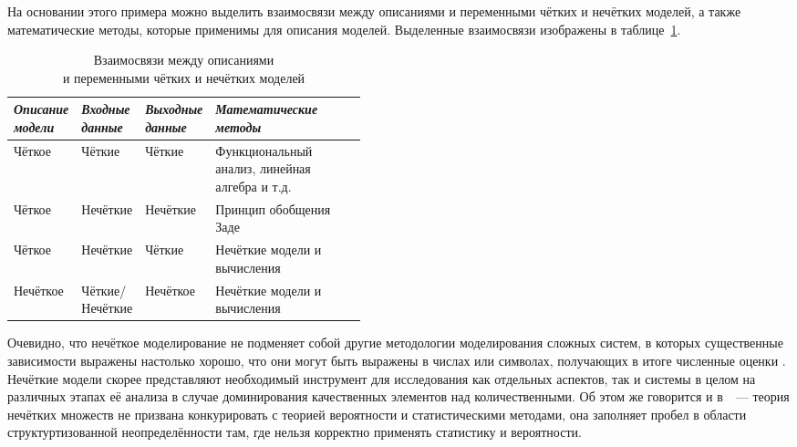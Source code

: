 На основании этого примера можно выделить взаимосвязи между описаниями и переменными чётких и нечётких моделей, а также математические методы, которые применимы для описания моделей. Выделенные взаимосвязи изображены в таблице~\ref{t:fuzzy-modeling-approaches}.
\begin{table}[h!]
\caption{Взаимосвязи между описаниями \\ и переменными чётких и нечётких моделей}
\label{t:fuzzy-modeling-approaches}
\begin{center}
\begin{tabularx}{\textwidth}{|p{0.15\linewidth}|p{0.15\linewidth}|p{0.15\linewidth}|X|}
	\hline
		\centering \textit{Описание модели} & \centering \textit{Входные данные} & \centering \textit{Выходные данные} & \centering \textit{Математические методы} \tabularnewline
	\hline
	\hline
		Чёткое & Чёткие & Чёткие & Функциональный анализ, линейная алгебра и т.д. \tabularnewline
	\hline
		Чёткое & Нечёткие & Нечёткие & Принцип обобщения Заде \tabularnewline
	\hline
		Чёткое & Нечёткие & Чёткие & Нечёткие модели и вычисления \tabularnewline
	\hline
		Нечёткое & Чёткие/\allowbreak Нечёткие & Нечёткое & Нечёткие модели и вычисления \tabularnewline
	\hline
\end{tabularx}
\end{center}
\end{table}

Очевидно, что нечёткое моделирование не подменяет собой другие методологии моделирования сложных систем, в которых существенные зависимости выражены настолько хорошо, что они могут быть выражены в числах или символах, получающих в итоге численные оценки \cite{Borisov_Fedulov}. Нечёткие модели скорее представляют необходимый инструмент для исследования как отдельных аспектов, так и системы в целом на различных этапах её анализа в случае доминирования качественных элементов над количественными. Об этом же говорится и в~\cite{Kaufmann}~--- теория нечётких множеств не призвана конкурировать с теорией вероятности и статистическими методами, она заполняет пробел в области структуртизованной неопределённости там, где нельзя корректно применять статистику и вероятности.

